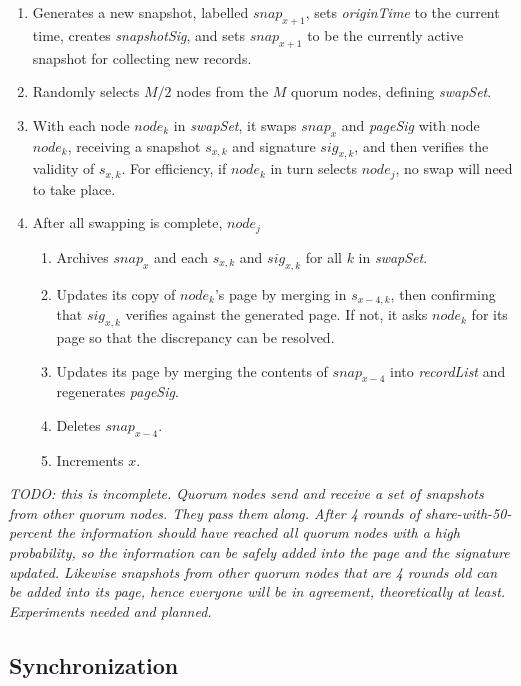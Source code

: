 \begin{enumerate}
	\item Generates a new snapshot, labelled $ snap_{x+1} $, sets \textit{originTime} to the current time, creates \textit{snapshotSig}, and sets $ snap_{x+1} $ to be the currently active snapshot for collecting new records.
	\item Randomly selects $ M / 2 $ nodes from the $ M $ quorum nodes, defining \textit{swapSet}.
	\item With each node $ node_{k} $ in \textit{swapSet}, it swaps $ snap_{x} $ and \textit{pageSig} with node $ node_{k} $, receiving a snapshot $ s_{x, k} $ and signature $ sig_{x, k} $, and then verifies the validity of $ s_{x, k} $. For efficiency, if $ node_{k} $ in turn selects $ node_{j} $, no swap will need to take place.
	\item After all swapping is complete, $ node_{j} $
		\begin{enumerate}
			\item Archives $ snap_{x} $ and each $ s_{x, k} $ and $ sig_{x, k} $ for all $ k $ in \textit{swapSet}.
			\item Updates its copy of $ node_{k} $'s page by merging in $ s_{x-4, k} $, then confirming that $ sig_{x, k} $ verifies against the generated page. If not, it asks $ node_{k} $ for its page so that the discrepancy can be resolved.
			\item Updates its page by merging the contents of $ snap_{x-4} $ into \textit{recordList} and regenerates \textit{pageSig}.
			\item Deletes $ snap_{x-4} $.
			\item Increments $ x $.
		\end{enumerate}
\end{enumerate}


\textit{TODO: this is incomplete. Quorum nodes send and receive a set of snapshots from other quorum nodes. They pass them along. After 4 rounds of share-with-50-percent the information should have reached all quorum nodes with a high probability, so the information can be safely added into the page and the signature updated. Likewise snapshots from other quorum nodes that are 4 rounds old can be added into its page, hence everyone will be in agreement, theoretically at least. Experiments needed and planned.}

\subsection{Synchronization}


